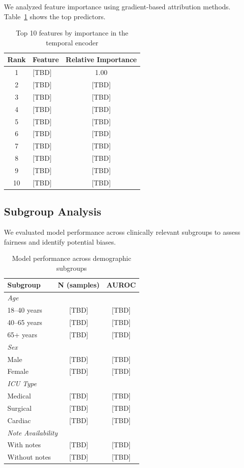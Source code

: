 We analyzed feature importance using gradient-based attribution methods. Table~\ref{tab:feature_importance} shows the top predictors.

\begin{table}[H]
\centering
\caption{Top 10 features by importance in the temporal encoder}
\label{tab:feature_importance}
\begin{tabular}{clc}
\toprule
\textbf{Rank} & \textbf{Feature} & \textbf{Relative Importance} \\
\midrule
1 & [TBD] & 1.00 \\
2 & [TBD] & [TBD] \\
3 & [TBD] & [TBD] \\
4 & [TBD] & [TBD] \\
5 & [TBD] & [TBD] \\
6 & [TBD] & [TBD] \\
7 & [TBD] & [TBD] \\
8 & [TBD] & [TBD] \\
9 & [TBD] & [TBD] \\
10 & [TBD] & [TBD] \\
\bottomrule
\end{tabular}
\end{table}

\subsection{Subgroup Analysis}

We evaluated model performance across clinically relevant subgroups to assess fairness and identify potential biases.

\begin{table}[H]
\centering
\caption{Model performance across demographic subgroups}
\label{tab:subgroups}
\begin{tabular}{lcc}
\toprule
\textbf{Subgroup} & \textbf{N (samples)} & \textbf{AUROC} \\
\midrule
\multicolumn{3}{l}{\textit{Age}} \\
18--40 years & [TBD] & [TBD] \\
40--65 years & [TBD] & [TBD] \\
65+ years & [TBD] & [TBD] \\
\midrule
\multicolumn{3}{l}{\textit{Sex}} \\
Male & [TBD] & [TBD] \\
Female & [TBD] & [TBD] \\
\midrule
\multicolumn{3}{l}{\textit{ICU Type}} \\
Medical & [TBD] & [TBD] \\
Surgical & [TBD] & [TBD] \\
Cardiac & [TBD] & [TBD] \\
\midrule
\multicolumn{3}{l}{\textit{Note Availability}} \\
With notes & [TBD] & [TBD] \\
Without notes & [TBD] & [TBD] \\
\bottomrule
\end{tabular}
\end{table}

